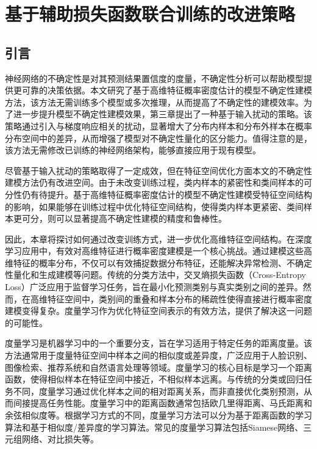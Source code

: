 

\chapter{基于辅助损失函数联合训练的改进策略}
\section{引言}
神经网络的不确定性是对其预测结果置信度的度量，不确定性分析可以帮助模型提供更可靠的决策依据。本文研究了基于高维特征概率密度估计的模型不确定性建模方法，该方法无需训练多个模型或多次推理，从而提高了不确定性的建模效率。为了进一步提升模型不确定性建模效果，第三章提出了一种基于输入扰动的策略。该策略通过引入与梯度响应相关的扰动，显著增大了分布内样本和分布外样本在概率分布空间中的差异，从而增强了模型对不确定性量化的区分能力。值得注意的是，该方法无需修改已训练的神经网络架构，能够直接应用于现有模型。

尽管基于输入扰动的策略取得了一定成效，但在特征空间优化方面本文的不确定性建模方法仍有改进空间。由于未改变训练过程，类内样本的紧密性和类间样本的可分性仍有待提升。基于高维特征概率密度估计的模型不确定性建模受特征空间结构的影响，如果能够在训练过程中优化特征空间结构，使得类内样本更紧密、类间样本更可分，则可以显著提高不确定性建模的精度和鲁棒性。

因此，本章将探讨如何通过改变训练方式，进一步优化高维特征空间结构。在深度学习应用中，有效对高维特征进行概率密度建模是一个核心挑战。通过建模这些高维特征的概率分布，不仅可以有效捕捉数据分布特征，还能解决异常检测、不确定性量化和生成建模等问题。传统的分类方法中，交叉熵损失函数（Cross-Entropy Loss）广泛应用于监督学习任务，旨在最小化预测类别与真实类别之间的差异。然而，在高维特征空间中，类别间的重叠和样本分布的稀疏性使得直接进行概率密度建模变得复杂。度量学习作为优化特征空间表示的有效方法，提供了解决这一问题的可能性。

度量学习\cite{kaya2019deep}\cite{kulis2013metric}\cite{yang2006distance}是机器学习中的一个重要分支，旨在学习适用于特定任务的距离度量。该方法通常用于度量特征空间中样本之间的相似度或差异度，广泛应用于人脸识别、图像检索、推荐系统和自然语言处理等领域。度量学习的核心目标是学习一个距离函数，使得相似样本在特征空间中接近，不相似样本远离。与传统的分类或回归任务不同，度量学习通过优化样本之间的相对距离关系，而非直接优化类别预测，从而间接提高任务性能。度量学习中的距离函数通常包括欧几里得距离、马氏距离和余弦相似度等。根据学习方式的不同，度量学习方法可以分为基于距离函数的学习算法和基于相似度/差异度的学习算法。常见的度量学习算法包括Siamese网络\cite{bromley1994signature}、三元组网络\cite{schroff2015facenet}、对比损失\cite{hadsell2006dimensionality}等。

